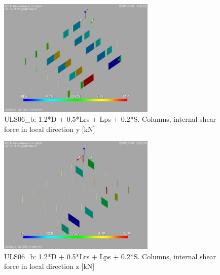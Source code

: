 \begin{figure}
\begin{center}
\includegraphics[width=75mm]{annex_res_columns/graphics/resSimplLC/ULS06_bcolumnsQy}
\caption{ULS06\_b: 1.2*D + 0.5*Lrs + Lps + 0.2*S. Columns, internal shear force in local direction y [kN]}
\end{center}
\end{figure}
\begin{figure}
\begin{center}
\includegraphics[width=75mm]{annex_res_columns/graphics/resSimplLC/ULS06_bcolumnsQz}
\caption{ULS06\_b: 1.2*D + 0.5*Lrs + Lps + 0.2*S. Columns, internal shear force in local direction z [kN]}
\end{center}
\end{figure}

